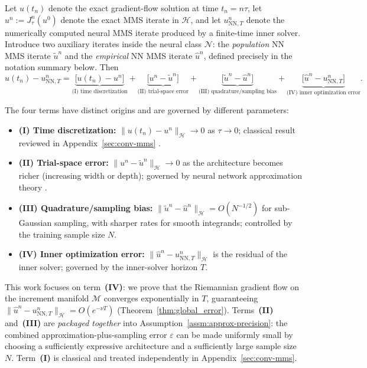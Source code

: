 \documentclass[twoside,11pt]{article}
\newcommand{\NN}{\mathrm{NN}}
\newcommand{\calH}{\mathcal{H}}
\newcommand{\calM}{\mathcal{M}}
\newcommand{\calN}{\mathcal{N}}
\begin{document}
\iffalse
Let $u(t_n)$ denote the exact gradient-flow solution at time $t_n = n\tau$, let $u^n := J_\tau^n(u^0)$ denote the exact MMS iterate in $\calH$, and let $u^n_{\NN,T}$ denote the numerically computed neural MMS iterate produced by a finite-time inner solver. Introduce two auxiliary iterates inside the neural class $\calN$: the \emph{population} NN MMS iterate $\tilde u^n$ and the \emph{empirical} NN MMS iterate $\hat u^n$, defined precisely in the notation summary below. Then
\begin{equation}\label{eq:intro:full-error-decomp}
u(t_n) - u^n_{\NN,T}
= \underbrace{\bigl[u(t_n) - u^n\bigr]}_{\text{(I) time discretization}}
+ \underbrace{\bigl[u^n - \tilde u^n\bigr]}_{\text{(II) trial-space error}}
+ \underbrace{\bigl[\tilde u^n - \hat u^n\bigr]}_{\text{(III) quadrature/sampling bias}}
+ \underbrace{\bigl[\hat u^n - u^n_{\NN,T}\bigr]}_{\text{(IV) inner optimization error}}.
\end{equation}

The four terms have distinct origins and are governed by different parameters:
\begin{itemize}
  \item \textbf{(I) Time discretization:} $\|u(t_n)-u^n\|_\calH \to 0$ as $\tau\to 0$; classical result reviewed in Appendix~\ref{sec:conv-mms} \citep{ambrosio2005gradient}.
  \item \textbf{(II) Trial-space error:} $\|u^n - \tilde u^n\|_\calH \to 0$ as the architecture becomes richer (increasing width or depth); governed by neural network approximation theory \citep{hornik1989multilayer,JMLR:v23:21-1404,maiti2024optimal}.
  \item \textbf{(III) Quadrature/sampling bias:} $\|\tilde u^n - \hat u^n\|_\calH = O(N^{-1/2})$ for sub-Gaussian sampling, with sharper rates for smooth integrands; controlled by the training sample size $N$.
  \item \textbf{(IV) Inner optimization error:} $\|\hat u^n - u^n_{\NN,T}\|_\calH$ is the residual of the inner solver; governed by the inner-solver horizon $T$.
\end{itemize}

This work focuses on term~\textbf{(IV)}: we prove that the Riemannian gradient flow on the increment manifold $\calM$ converges exponentially in $T$, guaranteeing $\|\hat u^n - u^n_{\NN,T}\|_\calH = O(e^{-\nu T})$ (Theorem~\ref{thm:global_error}). Terms~\textbf{(II)} and~\textbf{(III)} are \emph{packaged together} into Assumption~\ref{assm:approx-precision}: the combined approximation-plus-sampling error $\varepsilon$ can be made uniformly small by choosing a sufficiently expressive architecture and a sufficiently large sample size~$N$. Term~\textbf{(I)} is classical and treated independently in Appendix~\ref{sec:conv-mms}.
\end{document}
